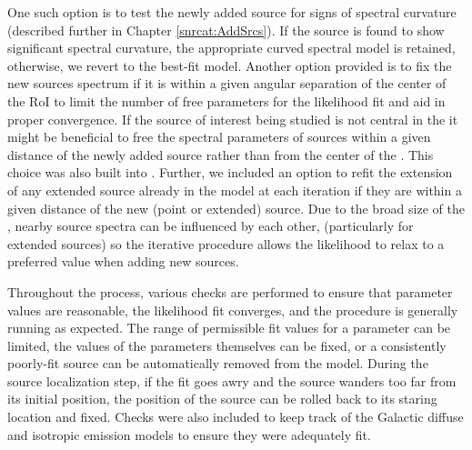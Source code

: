 One such option is to test the newly added source for signs of spectral curvature (described further in Chapter \ref{snrcat:AddSrcs}). If the source is found to show significant spectral curvature, the appropriate curved spectral model is retained, otherwise, we revert to the best-fit \pl{} model. Another option provided is to fix the new sources spectrum if it is within a given angular separation of the center of the RoI to limit the number of free parameters for the likelihood fit and aid in proper convergence. If the source of interest being studied is not central in the \roi{} it might be beneficial to free the spectral parameters of sources within a given distance of the newly added source rather than from the center of the \roi{}. This choice was also built into \srcs{}. Further, we included an option to refit the extension of any extended source already in the model at each iteration if they are within a given distance of the new (point or extended) source. Due to the broad size of the \psf{}, nearby source spectra can be influenced by each other, (particularly for extended sources) so the iterative procedure allows the likelihood to relax to a preferred value when adding new sources.

Throughout the \srcs{} process, various checks are performed to ensure that parameter values are reasonable,
the likelihood fit converges, and the procedure is generally running as expected. The range of permissible fit values for a parameter can be limited, the values of the parameters themselves can be fixed, or a consistently poorly-fit source can be automatically removed from the model. During the source localization step, if the fit goes awry and the source wanders too far from its initial position, the position of the source can be rolled back to its staring location and fixed. Checks were also included to keep track of the Galactic diffuse and isotropic emission models to ensure they were adequately fit.

